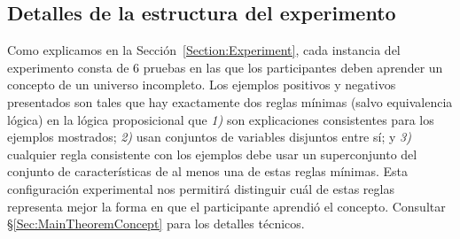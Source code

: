 \subsection{Detalles de la estructura del experimento} \label{FullExperimentDescription} 

Como explicamos en la Sección~\ref{Section:Experiment}, cada instancia del experimento consta de 6 pruebas en las que los participantes deben aprender un concepto de un universo incompleto. Los ejemplos positivos y negativos presentados son tales que hay exactamente dos reglas mínimas (salvo equivalencia lógica) en la lógica proposicional que {\em 1)} son explicaciones consistentes para los ejemplos mostrados; {\em 2)} usan conjuntos de variables disjuntos entre sí; y {\em 3)} cualquier regla consistente con los ejemplos debe usar un superconjunto del conjunto de características de al menos una de estas reglas mínimas. Esta configuración experimental nos permitirá distinguir cuál de estas reglas representa mejor la forma en que el participante aprendió el concepto. Consultar \S\ref{Sec:MainTheoremConcept} para los detalles técnicos.


